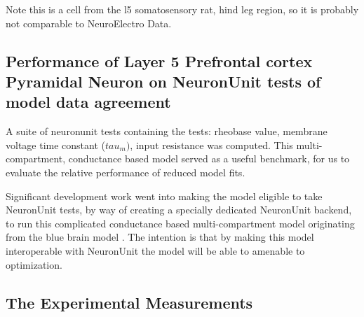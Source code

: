%
Note this is a cell from the l5 somatosensory rat, hind leg region, so it is probably not comparable to NeuroElectro Data.
\subsection{Performance of Layer 5 Prefrontal cortex Pyramidal Neuron on NeuronUnit tests of model data agreement}
\cite{van2016bluepyopt}
A suite of neuronunit tests containing the tests: rheobase value, membrane voltage time constant ($tau_{m})$, input resistance was computed. This multi-compartment, conductance based model served as a useful benchmark, for us to evaluate the relative performance of reduced model fits.

Significant development work went into making the model eligible to take NeuronUnit tests, by way of creating a specially dedicated NeuronUnit backend, to run this complicated conductance based multi-compartment model originating from the blue brain model \cite{markram2015reconstruction}. The intention is that by making this model interoperable with NeuronUnit the model will be able to amenable to optimization.


\subsection{The Experimental Measurements}

